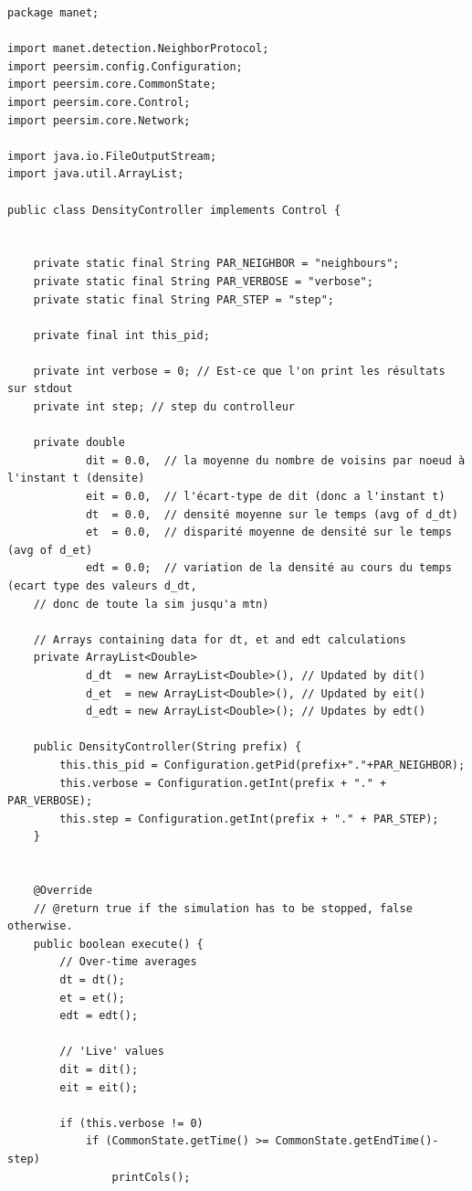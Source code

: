 \documentclass[a4paper]{article}
\begin{document}
\begin{verbatim}
package manet;

import manet.detection.NeighborProtocol;
import peersim.config.Configuration;
import peersim.core.CommonState;
import peersim.core.Control;
import peersim.core.Network;

import java.io.FileOutputStream;
import java.util.ArrayList;

public class DensityController implements Control {


    private static final String PAR_NEIGHBOR = "neighbours";
    private static final String PAR_VERBOSE = "verbose";
    private static final String PAR_STEP = "step";

    private final int this_pid;

    private int verbose = 0; // Est-ce que l'on print les résultats sur stdout
    private int step; // step du controlleur

    private double
            dit = 0.0,  // la moyenne du nombre de voisins par noeud à l'instant t (densite)
            eit = 0.0,  // l'écart-type de dit (donc a l'instant t)
            dt  = 0.0,  // densité moyenne sur le temps (avg of d_dt)
            et  = 0.0,  // disparité moyenne de densité sur le temps (avg of d_et)
            edt = 0.0;  // variation de la densité au cours du temps (ecart type des valeurs d_dt,
    // donc de toute la sim jusqu'a mtn)

    // Arrays containing data for dt, et and edt calculations
    private ArrayList<Double>
            d_dt  = new ArrayList<Double>(), // Updated by dit()
            d_et  = new ArrayList<Double>(), // Updated by eit()
            d_edt = new ArrayList<Double>(); // Updates by edt()

    public DensityController(String prefix) {
        this.this_pid = Configuration.getPid(prefix+"."+PAR_NEIGHBOR);
        this.verbose = Configuration.getInt(prefix + "." + PAR_VERBOSE);
        this.step = Configuration.getInt(prefix + "." + PAR_STEP);
    }


    @Override
    // @return true if the simulation has to be stopped, false otherwise.
    public boolean execute() {
        // Over-time averages
        dt = dt();
        et = et();
        edt = edt();

        // 'Live' values
        dit = dit();
        eit = eit();

        if (this.verbose != 0)
            if (CommonState.getTime() >= CommonState.getEndTime()-step)
                printCols();


\end{verbatim}
\end{document}
